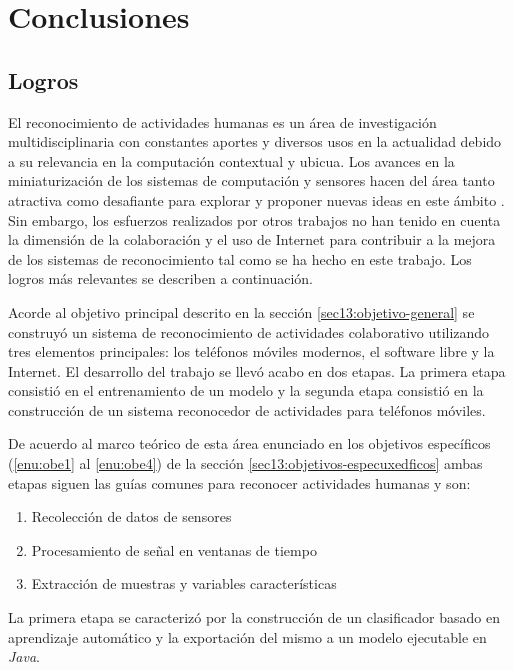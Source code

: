 
\chapter{Conclusiones}

\label{cap8:conclusiones-y-trabajos-futuros}

\section{Logros}

\label{sec81:conclusiones}

El reconocimiento de actividades humanas es un área de investigación
multidisciplinaria con constantes aportes y diversos usos en la actualidad
debido a su relevancia en la computación contextual y ubicua. Los
avances en la miniaturización de los sistemas de computación y sensores
hacen del área tanto atractiva como desafiante para explorar y proponer
nuevas ideas en este ámbito \cite{LaraLabrador2013}. Sin embargo,
los esfuerzos realizados por otros trabajos no han tenido en cuenta
la dimensión de la colaboración y el uso de Internet para contribuir
a la mejora de los sistemas de reconocimiento tal como se ha hecho
en este trabajo. Los logros más relevantes se describen a continuación.

Acorde al objetivo principal descrito en la sección \ref{sec13:objetivo-general}
se construyó un sistema de reconocimiento de actividades colaborativo
utilizando tres elementos principales: los teléfonos móviles modernos,
el software libre y la Internet. El desarrollo del trabajo se llevó
acabo en dos etapas. La primera etapa consistió en el entrenamiento
de un modelo y la segunda etapa consistió en la construcción de un
sistema reconocedor de actividades para teléfonos móviles.

De acuerdo al marco teórico de esta área enunciado en los objetivos
específicos (\ref{enu:obe1} al \ref{enu:obe4}) de la sección \ref{sec13:objetivos-especuxedficos}
ambas etapas siguen las guías comunes para reconocer actividades humanas
y son:
\begin{enumerate}
\item Recolección de datos de sensores
\item Procesamiento de señal en ventanas de tiempo
\item Extracción de muestras y variables características
\end{enumerate}
La primera etapa se caracterizó por la construcción de un clasificador
basado en aprendizaje automático y la exportación del mismo a un modelo
ejecutable en \emph{Java}.

